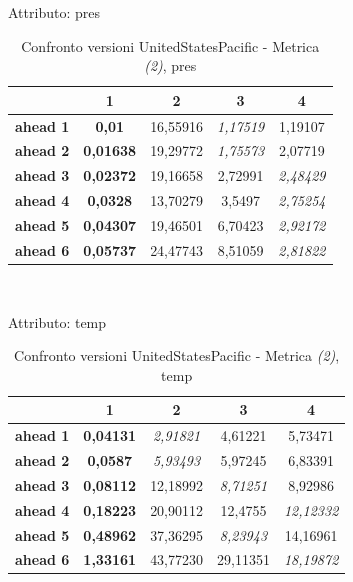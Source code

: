 \documentclass[12pt,a4paper,oneside,openright]{book}
\begin{document}
\medskip

Attributo: pres \\ 

\begin{table}[H]
\centering
\begin{tabular}{|c|c|c|c|c|}
\hline
& 1 & 2 & 3 & 4 \\
\hline
\textbf{ahead 1} & \textbf{0,01} & 16,55916 & \textit{1,17519} & 1,19107\\
\hline
\textbf{ahead 2} & \textbf{0,01638} & 19,29772 & \textit{1,75573} & 2,07719\\
\hline
\textbf{ahead 3} & \textbf{0,02372} & 19,16658 & 2,72991 & \textit{2,48429}\\
\hline
\textbf{ahead 4} & \textbf{0,0328} & 13,70279 & 3,5497 & \textit{2,75254}\\
\hline
\textbf{ahead 5} & \textbf{0,04307} & 19,46501 & 6,70423 & \textit{2,92172}\\
\hline
\textbf{ahead 6} & \textbf{0,05737} & 24,47743 & 8,51059 & \textit{2,81822}\\
\hline
\end{tabular} \\
\caption{Confronto versioni UnitedStatesPacific - Metrica \textit{(2)}, pres}
\end{table} 

\medskip

Attributo: temp \\ 

\begin{table}[H]
\centering
\begin{tabular}{|c|c|c|c|c|}
\hline
& 1 & 2 & 3 & 4 \\
\hline
\textbf{ahead 1} & \textbf{0,04131} & \textit{2,91821} & 4,61221 & 5,73471\\
\hline
\textbf{ahead 2} & \textbf{0,0587} & \textit{5,93493} & 5,97245 & 6,83391\\
\hline
\textbf{ahead 3} & \textbf{0,08112} & 12,18992 & \textit{8,71251} & 8,92986\\
\hline
\textbf{ahead 4} & \textbf{0,18223} & 20,90112 & 12,4755 & \textit{12,12332}\\
\hline
\textbf{ahead 5} & \textbf{0,48962} & 37,36295 & \textit{8,23943} & 14,16961\\
\hline
\textbf{ahead 6} & \textbf{1,33161} & 43,77230 & 29,11351 & \textit{18,19872}\\
\hline
\end{tabular} \\
\caption{Confronto versioni UnitedStatesPacific - Metrica \textit{(2)}, temp}
\end{table} 
\end{document}
